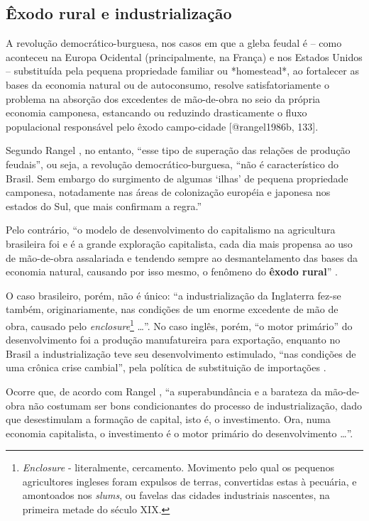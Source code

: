 \documentclass[
	12pt,				%
	oneside,			%
	a4paper,			%
	chapter=TITLE,		%
	section=TITLE,		%
	english,			%
	brazil				%
	]{abntex2}
\begin{document}
\subsection{Êxodo rural e
industrialização}\label{uxeaxodo-rural-e-industrializauxe7uxe3o}
\begin{citacao}
A revolução democrático-burguesa, nos casos em que a gleba feudal é -- como
aconteceu na Europa Ocidental (principalmente, na França) e nos Estados Unidos
-- substituída pela pequena propriedade familiar ou *homestead*, ao fortalecer
as bases da economia natural ou de autoconsumo, resolve satisfatoriamente o
problema na absorção dos excedentes de mão-de-obra no seio da própria economia
camponesa, estancando ou reduzindo drasticamente o fluxo populacional
responsável pelo êxodo campo-cidade [@rangel1986b, 133]. 
\end{citacao}
Segundo Rangel \autocite*[133]{rangel1986b}, no entanto, ``esse tipo de
superação das relações de produção feudais'', ou seja, a revolução
democrático-burguesa, ``não é característico do Brasil. Sem embargo do
surgimento de algumas `ilhas' de pequena propriedade camponesa,
notadamente nas áreas de colonização européia e japonesa nos estados do
Sul, que mais confirmam a regra.''

Pelo contrário, ``o modelo de desenvolvimento do capitalismo na
agricultura brasileira foi e é a grande exploração capitalista, cada dia
mais propensa ao uso de mão-de-obra assalariada e tendendo sempre ao
desmantelamento das bases da economia natural, causando por isso mesmo,
o fenômeno do \textbf{êxodo rural}'' \autocite[134, grifo
nosso]{rangel1986b}.

O caso brasileiro, porém, não é único: ``a industrialização da
Inglaterra fez-se também, originariamente, nas condições de um enorme
excedente de mão de obra, causado pelo \emph{enclosure}\footnote{\emph{Enclosure}
  - literalmente, cercamento. Movimento pelo qual os pequenos
  agricultores ingleses foram expulsos de terras, convertidas estas à
  pecuária, e amontoados nos \emph{slums}, ou favelas das cidades
  industriais nascentes, na primeira metade do século XIX.} \ldots{}''.
No caso inglês, porém, ``o motor primário'' do desenvolvimento foi a
produção manufatureira para exportação, enquanto no Brasil a
industrialização teve seu desenvolvimento estimulado, ``nas condições de
uma crônica crise cambial'', pela política de substituição de
importações \autocite[43-44]{rangel1962}.

Ocorre que, de acordo com Rangel \autocite*[134]{rangel1986b}, ``a
superabundância e a barateza da mão-de-obra não costumam ser bons
condicionantes do processo de industrialização, dado que desestimulam a
formação de capital, isto é, o investimento. Ora, numa economia
capitalista, o investimento é o motor primário do desenvolvimento
\ldots{}''.
\end{document}
